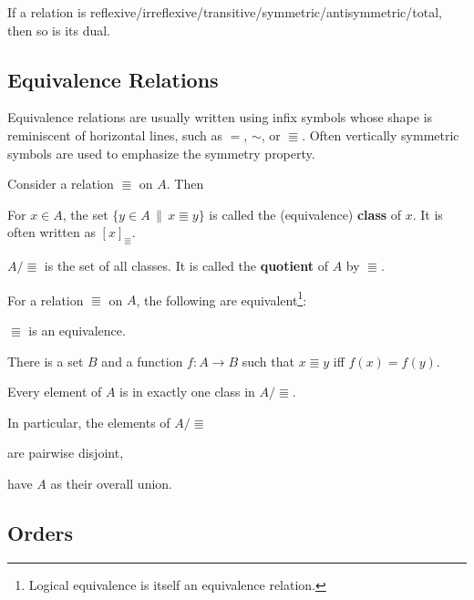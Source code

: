 \begin{theorem}
If a relation is reflexive/irreflexive/transitive/symmetric/antisymmetric/total, then so is its dual.
\end{theorem}

\subsection{Equivalence Relations}

Equivalence relations are usually written using infix symbols whose shape is reminiscent of horizontal lines, such as $=$, $\sim$, or $\Equiv$.
Often vertically symmetric symbols are used to emphasize the symmetry property.

\begin{definition}[Quotient]
Consider a relation $\Equiv$ on $A$.
Then
\begin{compactitem}
 \item For $x\in A$, the set $\{y\in A\,\|\,x\Equiv y\}$ is called the (equivalence) \textbf{class} of $x$.
  It is often written as $[x]_\Equiv$.
 \item $A/\Equiv$ is the set of all classes.
  It is called the \textbf{quotient} of $A$ by $\Equiv$.
\end{compactitem}
\end{definition}

\begin{theorem}
For a relation $\Equiv$ on $A$, the following are equivalent\footnote{Logical equivalence is itself an equivalence relation.}:
\begin{compactitem}
 \item $\Equiv$ is an equivalence.
 \item There is a set $B$ and a function $f:A\to B$ such that $x\Equiv y$ iff $f(x)=f(y)$.
 \item Every element of $A$ is in exactly one class in $A/\Equiv$.
\end{compactitem}

In particular, the elements of $A/\Equiv$ 
\begin{compactitem}
 \item are pairwise disjoint,
 \item have $A$ as their overall union.
\end{compactitem}
\end{theorem}

\subsection{Orders}

